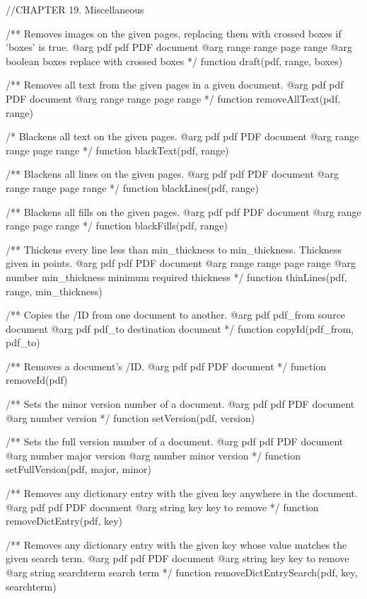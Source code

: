 //CHAPTER 19. Miscellaneous

/** Removes images on the given pages, replacing them with crossed boxes if
'boxes' is true.
@arg {pdf} pdf PDF document
@arg {range} range page range
@arg {boolean} boxes replace with crossed boxes */
function draft(pdf, range, boxes) {}

/** Removes all text from the given pages in a given document.
@arg {pdf} pdf PDF document
@arg {range} range page range */
function removeAllText(pdf, range) {}

/* Blackens all text on the given pages.
@arg {pdf} pdf PDF document
@arg {range} range page range */
function blackText(pdf, range) {}

/** Blackens all lines on the given pages.
@arg {pdf} pdf PDF document
@arg {range} range page range */
function blackLines(pdf, range) {}

/** Blackens all fills on the given pages.
@arg {pdf} pdf PDF document
@arg {range} range page range */
function blackFills(pdf, range) {}

/** Thickens every line less than min_thickness to min_thickness. Thickness
given in points.
@arg {pdf} pdf PDF document
@arg {range} range page range
@arg {number} min_thickness minimum required thickness */
function thinLines(pdf, range, min_thickness) {}

/** Copies the /ID from one document to another.
@arg {pdf} pdf_from source document
@arg {pdf} pdf_to destination document */
function copyId(pdf_from, pdf_to) {}

/** Removes a document's /ID.
@arg {pdf} pdf PDF document */
function removeId(pdf) {}

/** Sets the minor version number of a document.
@arg {pdf} pdf PDF document
@arg {number} version */
function setVersion(pdf, version) {}

/** Sets the full version number of a document.
@arg {pdf} pdf PDF document
@arg {number} major version
@arg {number} minor version */
function setFullVersion(pdf, major, minor) {}

/** Removes any dictionary entry with the given key anywhere in the document.
@arg {pdf} pdf PDF document
@arg {string} key key to remove */
function removeDictEntry(pdf, key) {}

/** Removes any dictionary entry with the given key whose value matches the
given search term.
@arg {pdf} pdf PDF document
@arg {string} key key to remove
@arg {string} searchterm search term */
function removeDictEntrySearch(pdf, key, searchterm) {}

